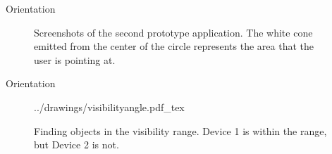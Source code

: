 \begin{frame}{Orientation}{}
\centering
\begin{figure}[!htb]%
    \caption{Screenshots of the second prototype application. The white cone emitted from the center of the circle represents the area that the user is pointing at.}
\label{fig:prototype2-app-screenshots}
\end{figure}
\end{frame}

\begin{frame}{Orientation}{}
\centering
\begin{figure}[!htb]
    \centering
    \def\svgwidth{0.7\textwidth}
    {../drawings/visibilityangle.pdf_tex}
    \caption{Finding objects in the visibility range. Device 1 is within the range, but Device 2 is not.}
\label{fig:visibilityangle}
\end{figure}
\end{frame}